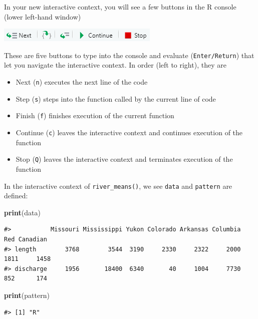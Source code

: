 \documentclass[
]{book}
\newenvironment{Shaded}{\begin{snugshade}}{\end{snugshade}}
\newcommand{\KeywordTok}[1]{\textcolor[rgb]{0.13,0.29,0.53}{\textbf{#1}}}
\newcommand{\NormalTok}[1]{#1}
\providecommand{\tightlist}{%
  \setlength{\itemsep}{0pt}\setlength{\parskip}{0pt}}
\begin{document}
In your new interactive context, you will see a few buttons in the R console (lower left-hand window)

\includegraphics[width=1\linewidth]{images/newrpack_files8}

These are five buttons to type into the console and evaluate (\texttt{Enter/Return}) that let you navigate the interactive context. In order (left to right), they are

\begin{itemize}
\tightlist
\item
  Next (\texttt{n}) executes the next line of the code
\item
  Step (\texttt{s}) steps into the function called by the current line of code
\item
  Finish (\texttt{f}) finishes execution of the current function
\item
  Continue (\texttt{c}) leaves the interactive context and continues execution of the function
\item
  Stop (\texttt{Q}) leaves the interactive context and terminates execution of the function
\end{itemize}

In the interactive context of \texttt{river\_means()}, we see \texttt{data} and \texttt{pattern} are defined:

\begin{Shaded}
\begin{Highlighting}[]
\KeywordTok{print}\NormalTok{(data)}
\end{Highlighting}
\end{Shaded}

\begin{verbatim}
#>           Missouri Mississippi Yukon Colorado Arkansas Columbia  Red Canadian
#> length        3768        3544  3190     2330     2322     2000 1811     1458
#> discharge     1956       18400  6340       40     1004     7730  852      174
\end{verbatim}

\begin{Shaded}
\begin{Highlighting}[]
\KeywordTok{print}\NormalTok{(pattern)}
\end{Highlighting}
\end{Shaded}

\begin{verbatim}
#> [1] "R"
\end{verbatim}
\end{document}
